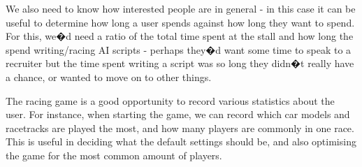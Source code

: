 We also need to know how interested people are in general - in this case it can be useful to determine how long a user spends against how long they want to spend. For this, we�d need a ratio of the total time spent at the stall and how long the spend writing/racing AI scripts - perhaps they�d want some time to speak to a recruiter but the time spent writing a script was so long they didn�t really have a chance, or wanted to move on to other things.

The racing game is a good opportunity to record various statistics about the user. For instance, when starting the game, we can record which car models and racetracks are played the most, and how many players are commonly in one race. This is useful in deciding what the default settings should be, and also optimising the game for the most common amount of players.


